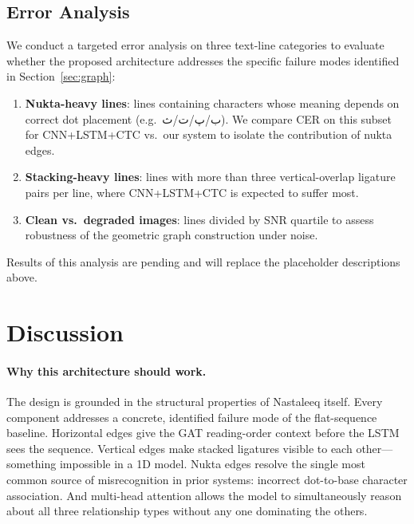 \documentclass[11pt]{article}
\begin{document}
\subsection{Error Analysis}

We conduct a targeted error analysis on three text-line categories to evaluate
whether the proposed architecture addresses the specific failure modes identified
in Section~\ref{sec:graph}:

\begin{enumerate}[nosep]
  \item \textbf{Nukta-heavy lines}: lines containing characters whose meaning depends
        on correct dot placement (e.g.\ {\urdufont ب/پ/ت/ث}).
        We compare CER on this subset for CNN+LSTM+CTC vs.\ our system to isolate the
        contribution of nukta edges.
  \item \textbf{Stacking-heavy lines}: lines with more than three vertical-overlap
        ligature pairs per line, where CNN+LSTM+CTC is expected to suffer most.
  \item \textbf{Clean vs.\ degraded images}: lines divided by SNR quartile to assess
        robustness of the geometric graph construction under noise.
\end{enumerate}

\noindent
Results of this analysis are pending and will replace the placeholder descriptions
above.

\section{Discussion}

\paragraph{Why this architecture should work.}
The design is grounded in the structural properties of Nastaleeq itself.
Every component addresses a concrete, identified failure mode of the flat-sequence
baseline.
Horizontal edges give the GAT reading-order context before the LSTM sees the sequence.
Vertical edges make stacked ligatures visible to each other---something impossible in a
1D model.
Nukta edges resolve the single most common source of misrecognition in prior
systems: incorrect dot-to-base character association.
And multi-head attention allows the model to simultaneously reason about all three
relationship types without any one dominating the others.
\end{document}
